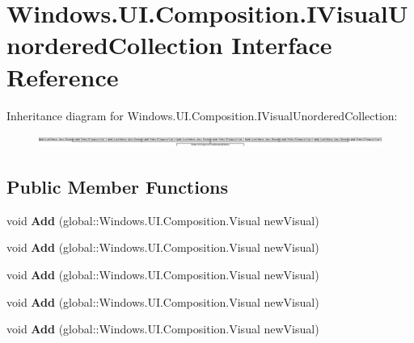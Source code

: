 \hypertarget{interface_windows_1_1_u_i_1_1_composition_1_1_i_visual_unordered_collection}{}\section{Windows.\+U\+I.\+Composition.\+I\+Visual\+Unordered\+Collection Interface Reference}
\label{interface_windows_1_1_u_i_1_1_composition_1_1_i_visual_unordered_collection}
Inheritance diagram for Windows.\+U\+I.\+Composition.\+I\+Visual\+Unordered\+Collection\+:\begin{figure}[H]
\begin{center}
\leavevmode
\includegraphics[height=0.423440cm]{interface_windows_1_1_u_i_1_1_composition_1_1_i_visual_unordered_collection}
\end{center}
\end{figure}
\subsection*{Public Member Functions}
\begin{DoxyCompactItemize}
\item 
\mbox{\label{interface_windows_1_1_u_i_1_1_composition_1_1_i_visual_unordered_collection_a1efe75c1eac07473dd71addc1d07e27c}} 
void {\bfseries Add} (global\+::\+Windows.\+U\+I.\+Composition.\+Visual new\+Visual)
\item 
\mbox{\label{interface_windows_1_1_u_i_1_1_composition_1_1_i_visual_unordered_collection_a1efe75c1eac07473dd71addc1d07e27c}} 
void {\bfseries Add} (global\+::\+Windows.\+U\+I.\+Composition.\+Visual new\+Visual)
\item 
\mbox{\label{interface_windows_1_1_u_i_1_1_composition_1_1_i_visual_unordered_collection_a1efe75c1eac07473dd71addc1d07e27c}} 
void {\bfseries Add} (global\+::\+Windows.\+U\+I.\+Composition.\+Visual new\+Visual)
\item 
\mbox{\label{interface_windows_1_1_u_i_1_1_composition_1_1_i_visual_unordered_collection_a1efe75c1eac07473dd71addc1d07e27c}} 
void {\bfseries Add} (global\+::\+Windows.\+U\+I.\+Composition.\+Visual new\+Visual)
\item 
\mbox{\label{interface_windows_1_1_u_i_1_1_composition_1_1_i_visual_unordered_collection_a1efe75c1eac07473dd71addc1d07e27c}} 
void {\bfseries Add} (global\+::\+Windows.\+U\+I.\+Composition.\+Visual new\+Visual)
\end{DoxyCompactItemize}


